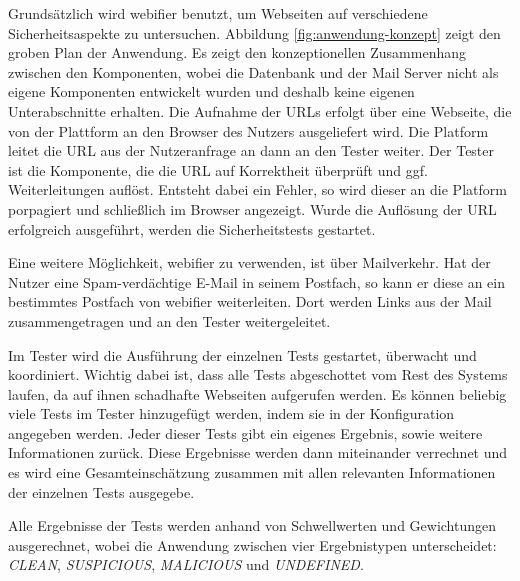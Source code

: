 Grundsätzlich wird webifier benutzt, um Webseiten auf verschiedene Sicherheitsaspekte zu untersuchen.
Abbildung \ref{fig:anwendung-konzept} zeigt den groben Plan der Anwendung.
Es zeigt den konzeptionellen Zusammenhang zwischen den Komponenten, wobei die Datenbank und der Mail Server nicht als eigene Komponenten entwickelt wurden und deshalb keine eigenen Unterabschnitte erhalten.
Die Aufnahme der URLs erfolgt über eine Webseite, die von der Plattform an den Browser des Nutzers ausgeliefert wird.
Die Platform leitet die \ac{URL} aus der Nutzeranfrage an dann an den Tester weiter.
Der Tester ist die Komponente, die die \ac{URL} auf Korrektheit überprüft und ggf. Weiterleitungen auflöst.
Entsteht dabei ein Fehler, so wird dieser an die Platform porpagiert und schließlich im Browser angezeigt.
Wurde die Auflösung der \ac{URL} erfolgreich ausgeführt, werden die Sicherheitstests gestartet.

Eine weitere Möglichkeit, webifier zu verwenden, ist über Mailverkehr.
Hat der Nutzer eine Spam-verdächtige E-Mail in seinem Postfach, so kann er diese an ein bestimmtes Postfach von webifier weiterleiten.
Dort werden Links  aus der Mail zusammengetragen und an den Tester weitergeleitet.

Im Tester wird die Ausführung der einzelnen Tests gestartet, überwacht und koordiniert.
Wichtig dabei ist, dass alle Tests abgeschottet vom Rest des Systems laufen, da auf ihnen schadhafte Webseiten aufgerufen werden.
Es können beliebig viele Tests im Tester hinzugefügt werden, indem sie in der Konfiguration angegeben werden.
Jeder dieser Tests gibt ein eigenes Ergebnis, sowie weitere Informationen zurück.
Diese Ergebnisse werden dann miteinander verrechnet und es wird eine Gesamteinschätzung zusammen mit allen relevanten Informationen der einzelnen Tests ausgegebe.

Alle Ergebnisse der Tests werden anhand von Schwellwerten und Gewichtungen ausgerechnet, wobei die Anwendung zwischen vier Ergebnistypen unterscheidet: \textit{CLEAN}, \textit{SUSPICIOUS}, \textit{MALICIOUS} und \textit{UNDEFINED}.

